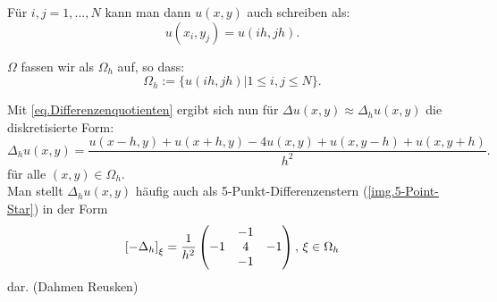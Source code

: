 Für $i,j = 1,...,N$ kann man dann $u(x,y)$ auch schreiben als:
\begin{equation}
u(x_{i},y_{j}) = u(ih,jh).
\end{equation}

$\Omega$ fassen wir als $\Omega_{h}$ auf, so dass:
\begin{equation}
\Omega_{h} := \{u(ih, jh) | 1 \le i,j \le N\}.
\end{equation}

\label{img.5-Point-Star}

Mit \autoref{eq.Differenzenquotienten} ergibt sich nun für $\Delta u(x,y) \approx \Delta_{h} u(x,y)$ die diskretisierte Form:
\begin{equation}
\Delta_{h} u(x,y) = \frac {u(x-h,y) + u(x+h,y) - 4u(x,y) + u(x,y-h) + u(x,y+h)} {h^{2}}.\label{eq.5-Point-Star}
\end{equation}
für alle $(x,y) \in \Omega_{h}$. \\
Man stellt $\Delta_{h} u(x,y)$ häufig auch als 5-Punkt-Differenzenstern (\autoref{img.5-Point-Star}) in der Form
\begin{equation}
\left[-\Delta_{h}\right]_{\xi} = \frac {1} {h^{2}}
\begin{pmatrix}
  & -1 & \\
-1 & 4 & -1 \\
  & -1 & 
\end{pmatrix}
\textnormal{, } \xi \in \Omega_{h}
\end{equation}
dar. (Dahmen Reusken)

